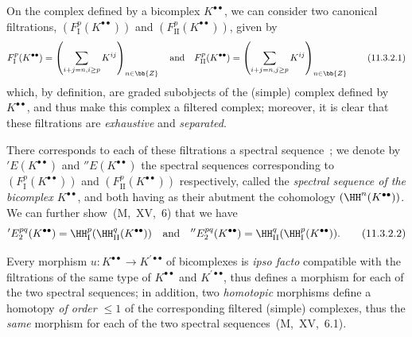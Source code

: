 \begin{env}[11.3.2]
\label{0.11.3.2}
On the complex defined by a bicomplex $K^{\bullet\bullet}$, we can consider two canonical filtrations, $(F_\mathrm{I}^p(K^{\bullet\bullet}))$ and $(F_\mathrm{II}^p(K^{\bullet\bullet}))$, given by
\[
\label{0.11.3.2.1}
  F_\mathrm{I}^p(K^{\bullet\bullet})
  = \left(\sum_{i+j=n,i\geq p}K^{ij}\right)_{n\in\bb{Z}}
  \quad\text{and}\quad
  F_\mathrm{II}^p(K^{\bullet\bullet})
  = \left(\sum_{i+j=n,j\geq p}K^{ij}\right)_{n\in\bb{Z}}
  \tag{11.3.2.1}
\]
which, by definition, are graded subobjects of the (simple) complex defined by $K^{\bullet\bullet}$, and thus make this complex a filtered complex;
moreover, it is clear that these filtrations are \emph{exhaustive} and \emph{separated}.

There corresponds to each of these filtrations a spectral sequence~;
we denote by $'E(K^{\bullet\bullet})$ and $''E(K^{\bullet\bullet})$ the spectral sequences corresponding to $(F_\mathrm{I}^p(K^{\bullet\bullet}))$ and $(F_\mathrm{II}^p(K^{\bullet\bullet}))$ respectively, called the \emph{spectral sequence of the bicomplex $K^{\bullet\bullet}$}, and both having as their abutment the cohomology $(\HH^n(K^{\bullet\bullet}))$.
We can further show~(M,~XV,~6) that we have
\[
\label{0.11.3.2.2}
  'E_2^{pq}(K^{\bullet\bullet})
  = \HH_\mathrm{I}^p(\HH_\mathrm{II}^q(K^{\bullet\bullet}))
  \quad\text{and}\quad
  ''E_2^{pq}(K^{\bullet\bullet})
  = \HH_\mathrm{II}^q(\HH_\mathrm{I}^p(K^{\bullet\bullet})).
  \tag{11.3.2.2}
\]

Every morphism $u:K^{\bullet\bullet}\to K^{\prime\bullet\bullet}$ of bicomplexes is \emph{ipso facto} compatible with the filtrations of the same type of $K^{\bullet\bullet}$ and $K^{\prime\bullet\bullet}$, thus defines a morphism for each of the two spectral sequences;
in addition, two \emph{homotopic} morphisms define a homotopy \emph{of order $\leq 1$} of the corresponding filtered (simple) complexes, thus the \emph{same} morphism for each of the two spectral sequences~(M,~XV,~6.1).
\end{env}

